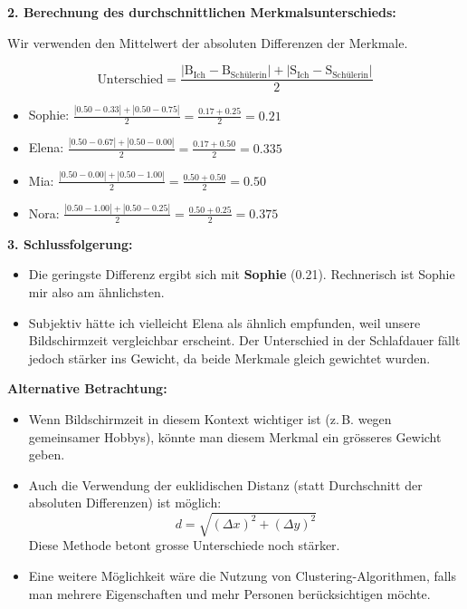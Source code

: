 \begin{aufgabe}{5}
\vspace{1em}
\textbf{2. Berechnung des durchschnittlichen Merkmalsunterschieds:}

Wir verwenden den Mittelwert der absoluten Differenzen der Merkmale.

\[
\text{Unterschied} = \frac{|\text{B}_{\text{Ich}} - \text{B}_{\text{Schülerin}}| + |\text{S}_{\text{Ich}} - \text{S}_{\text{Schülerin}}|}{2}
\]

\begin{itemize}
  \item Sophie: $\frac{|0.50 - 0.33| + |0.50 - 0.75|}{2} = \frac{0.17 + 0.25}{2} = 0.21$
  \item Elena: $\frac{|0.50 - 0.67| + |0.50 - 0.00|}{2} = \frac{0.17 + 0.50}{2} = 0.335$
  \item Mia: $\frac{|0.50 - 0.00| + |0.50 - 1.00|}{2} = \frac{0.50 + 0.50}{2} = 0.50$
  \item Nora: $\frac{|0.50 - 1.00| + |0.50 - 0.25|}{2} = \frac{0.50 + 0.25}{2} = 0.375$
\end{itemize}

\vspace{1em}
\textbf{3. Schlussfolgerung:}

\begin{itemize}
  \item Die geringste Differenz ergibt sich mit \textbf{Sophie} (0.21). Rechnerisch ist Sophie mir also am ähnlichsten.
  \item Subjektiv hätte ich vielleicht Elena als ähnlich empfunden, weil unsere Bildschirmzeit vergleichbar erscheint. Der Unterschied in der Schlafdauer fällt jedoch stärker ins Gewicht, da beide Merkmale gleich gewichtet wurden.
\end{itemize}

\vspace{1em}
\textbf{Alternative Betrachtung:}

\begin{itemize}
  \item Wenn Bildschirmzeit in diesem Kontext wichtiger ist (z.\,B. wegen gemeinsamer Hobbys), könnte man diesem Merkmal ein grösseres Gewicht geben.
  \item Auch die Verwendung der euklidischen Distanz (statt Durchschnitt der absoluten Differenzen) ist möglich:
  \[
  d = \sqrt{(\Delta x)^2 + (\Delta y)^2}
  \]
  Diese Methode betont grosse Unterschiede noch stärker.
  \item Eine weitere Möglichkeit wäre die Nutzung von Clustering-Algorithmen, falls man mehrere Eigenschaften und mehr Personen berücksichtigen möchte.
\end{itemize}

\end{aufgabe}


